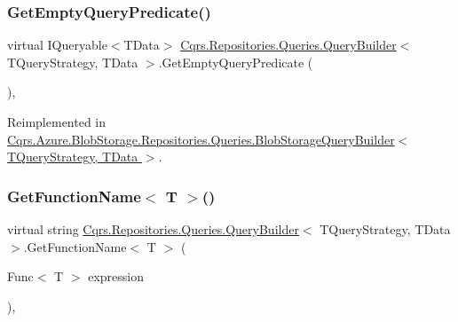 \mbox{\label{classCqrs_1_1Repositories_1_1Queries_1_1QueryBuilder_a7dc8f0da3bb4ef54b8cbdda6c50ee0a1_a7dc8f0da3bb4ef54b8cbdda6c50ee0a1}} 
\subsubsection{\texorpdfstring{Get\+Empty\+Query\+Predicate()}{GetEmptyQueryPredicate()}}
{\footnotesize\ttfamily virtual I\+Queryable$<$T\+Data$>$ \hyperlink{classCqrs_1_1Repositories_1_1Queries_1_1QueryBuilder}{Cqrs.\+Repositories.\+Queries.\+Query\+Builder}$<$ T\+Query\+Strategy, T\+Data $>$.Get\+Empty\+Query\+Predicate (\begin{DoxyParamCaption}{ }\end{DoxyParamCaption})\hspace{0.3cm}{\ttfamily [protected]}, {\ttfamily [virtual]}}



Reimplemented in \hyperlink{classCqrs_1_1Azure_1_1BlobStorage_1_1Repositories_1_1Queries_1_1BlobStorageQueryBuilder_a5987844de032c5473714dafcee7f4ae1_a5987844de032c5473714dafcee7f4ae1}{Cqrs.\+Azure.\+Blob\+Storage.\+Repositories.\+Queries.\+Blob\+Storage\+Query\+Builder$<$ T\+Query\+Strategy, T\+Data $>$}.

\mbox{\label{classCqrs_1_1Repositories_1_1Queries_1_1QueryBuilder_a2fce57b724f5443ea75e2f17ae07d401_a2fce57b724f5443ea75e2f17ae07d401}} 
\subsubsection{\texorpdfstring{Get\+Function\+Name$<$ T $>$()}{GetFunctionName< T >()}}
{\footnotesize\ttfamily virtual string \hyperlink{classCqrs_1_1Repositories_1_1Queries_1_1QueryBuilder}{Cqrs.\+Repositories.\+Queries.\+Query\+Builder}$<$ T\+Query\+Strategy, T\+Data $>$.Get\+Function\+Name$<$ T $>$ (\begin{DoxyParamCaption}\item[{Func$<$ T $>$}]{expression }\end{DoxyParamCaption})\hspace{0.3cm}{\ttfamily [protected]}, {\ttfamily [virtual]}}

